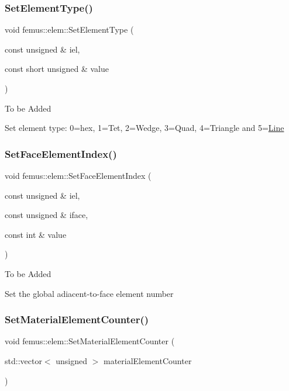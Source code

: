 \mbox{\label{classfemus_1_1elem_a23cec6d31d533bfc2a387f4cf23dc763}} 
\subsubsection{\texorpdfstring{Set\+Element\+Type()}{SetElementType()}}
{\footnotesize\ttfamily void femus\+::elem\+::\+Set\+Element\+Type (\begin{DoxyParamCaption}\item[{const unsigned \&}]{iel,  }\item[{const short unsigned \&}]{value }\end{DoxyParamCaption})}

To be Added

Set element type\+: 0=hex, 1=Tet, 2=Wedge, 3=Quad, 4=Triangle and 5=\mbox{\hyperlink{classfemus_1_1_line}{Line}} \mbox{\label{classfemus_1_1elem_a58bffe5580e2007da669dfe8fa18ad16}} 
\subsubsection{\texorpdfstring{Set\+Face\+Element\+Index()}{SetFaceElementIndex()}}
{\footnotesize\ttfamily void femus\+::elem\+::\+Set\+Face\+Element\+Index (\begin{DoxyParamCaption}\item[{const unsigned \&}]{iel,  }\item[{const unsigned \&}]{iface,  }\item[{const int \&}]{value }\end{DoxyParamCaption})}

To be Added

Set the global adiacent-\/to-\/face element number \mbox{\label{classfemus_1_1elem_a72997e17f23dc7b2a867c66fef3f5b3c}} 
\subsubsection{\texorpdfstring{Set\+Material\+Element\+Counter()}{SetMaterialElementCounter()}}
{\footnotesize\ttfamily void femus\+::elem\+::\+Set\+Material\+Element\+Counter (\begin{DoxyParamCaption}\item[{std\+::vector$<$ unsigned $>$}]{material\+Element\+Counter }\end{DoxyParamCaption})\hspace{0.3cm}{\ttfamily [inline]}}

